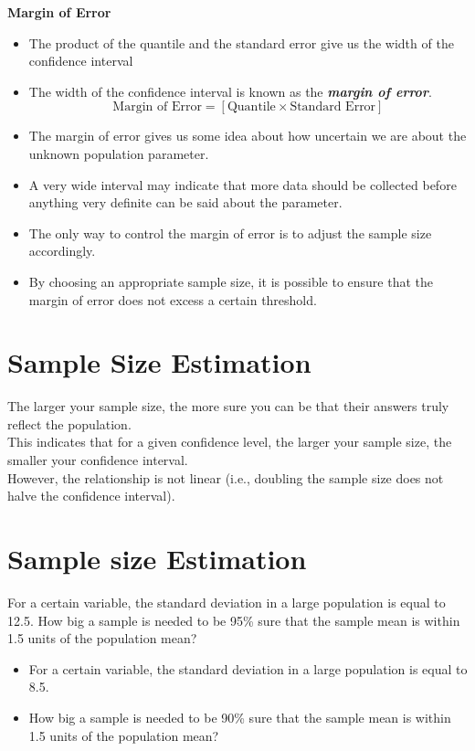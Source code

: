 \textbf{Margin of Error}

\begin{itemize}
\item The product of the quantile and the standard error give us the width of the confidence interval
\item The width of the confidence interval is known as the \textbf{\emph{margin of error}}.  \[ \mbox{Margin of Error}  = \left[ \mbox{Quantile} \times \mbox{Standard Error} \right] \]
\item The margin of error gives us some idea about how uncertain we are about the unknown population parameter. \item A very wide interval may indicate that more data should be collected before anything very definite can be said about the parameter.
\item The only way to control the margin of error is to adjust the sample size accordingly.
\item By choosing an appropriate sample size, it is possible to ensure that the margin of error does not excess a certain threshold.
\end{itemize}



\section{Sample Size Estimation}

The larger your sample size, the more sure you can be that their answers truly reflect the population.\\ This indicates that for a given confidence level, the larger your sample size, the smaller your confidence interval. \\However, the relationship is not linear (i.e., doubling the sample size does not halve the confidence interval).

\section{Sample size Estimation}
For a certain variable, the standard deviation in a large population is equal to 12.5.
How big a sample is needed to be 95\% sure that the sample mean is within 1.5 units of the population mean?


\begin{itemize}
\item For a certain variable, the standard deviation in a large population is equal to 8.5.
\item How big a sample is needed to be 90\% sure that the sample mean is within 1.5
units of the population mean?
\end{itemize}




